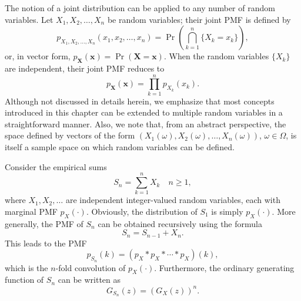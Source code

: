 The notion of a joint distribution can be applied to any number of random variables.
Let $X_1, X_2, \ldots, X_n$ be random variables; their joint PMF is defined by
\begin{equation*}
p_{X_1, X_2, \ldots, X_n} (x_1, x_2, \ldots, x_n) = \Pr \left( \bigcap_{k=1}^n \{ X_k = x_k \} \right),
\end{equation*}
or, in vector form, $p_{\mathbf{X}} (\mathbf{x}) = \Pr ( \mathbf{X} = \mathbf{x} )$.
When the random variables $\{ X_k \}$ are independent, their joint PMF reduces to
\begin{equation*}
p_{\mathbf{X}} (\mathbf{x}) = \prod_{k=1}^n p_{X_k} (x_k) .
\end{equation*}
Although not discussed in details herein, we emphasize that most concepts introduced in this chapter can be extended to multiple random variables in a straightforward manner.
Also, we note that, from an abstract perspective, the space defined by vectors of the form $( X_1 (\omega), X_2 (\omega), \ldots, X_n (\omega) )$, $\omega \in \Omega$, is itself a sample space on which random variables can be defined.

Consider the empirical sums
\begin{equation*}
S_n = \sum_{k=1}^n X_k \quad n \geq 1 ,
\end{equation*}
where $X_1, X_2, \ldots$ are independent integer-valued random variables, each with marginal PMF $p_X (\cdot)$.
Obviously, the distribution of $S_1$ is simply $p_X (\cdot)$.
More generally, the PMF of $S_n$ can be obtained recursively using the formula
\begin{equation*}
S_n = S_{n-1} + X_n .
\end{equation*}
This leads to the PMF
\begin{equation*}
p_{S_n} (k) = (p_X \ast p_X \ast \cdots \ast p_X ) (k) ,
\end{equation*}
which is the $n$-fold convolution of $p_X (\cdot)$.
Furthermore, the ordinary generating function of $S_n$ can be written as
\begin{equation*}
G_{S_n} (z) = \left( G_X (z) \right)^n.
\end{equation*}

